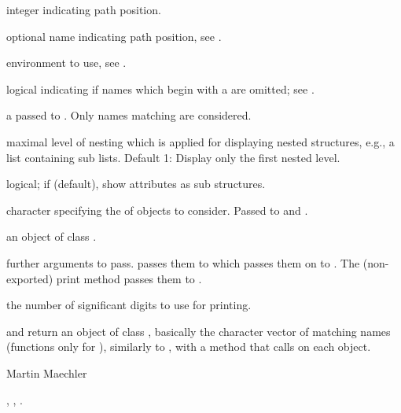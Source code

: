 \begin{Arguments}
\begin{ldescription}
\item[\code{pos}] integer indicating  path position.
\item[\code{name}] optional name indicating  path
position, see .
\item[\code{envir}] environment to use, see .
\item[\code{all.names}] logical indicating if names which begin with a
 are omitted; see .
\item[\code{pattern}] a  passed to .
Only names matching  are considered.
\item[\code{max.level}] maximal level of nesting which is applied for
displaying nested structures, e.g., a list containing sub lists.
Default 1: Display only the first nested level.
\item[\code{give.attr}] logical; if  (default), show attributes
as sub structures.
\item[\code{mode}] character specifying the  of objects to
consider.  Passed to  and .
\item[\code{x}] an object of class .
\item[\code{...}] further arguments to pass.   passes them to
 which passes them on to .  The
(non-exported) print method  passes them to
.
\item[\code{digits}] the number of significant digits to use for printing.
\end{ldescription}
\end{Arguments}
%
\begin{Value}
 and  return an object of class
, basically the character vector of matching names
(functions only for ), similarly to
, with a  method that calls 
on each object.
\end{Value}
%
\begin{Author}\relax
Martin Maechler
\end{Author}
%
\begin{SeeAlso}\relax
{}, , .
\end{SeeAlso}
